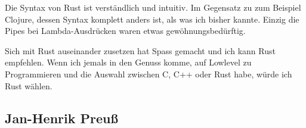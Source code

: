 \documentclass[letterpaper,12pt]{article}
\begin{document}
    Die Syntax von Rust ist verständlich und intuitiv.
    Im Gegensatz zu zum Beispiel Clojure, dessen Syntax komplett anders ist, als was ich bisher kannte.
    Einzig die Pipes bei Lambda-Ausdrücken waren etwas gewöhnungsbedürftig.

    Sich mit Rust auseinander zusetzen hat Spass gemacht und ich kann Rust empfehlen.
    Wenn ich jemals in den Genuss komme, auf Lowlevel zu Programmieren und die Auswahl zwischen C, C++ oder Rust habe,
        würde ich Rust wählen.

    \subsection{Jan-Henrik Preuß}\label{subsec:jan}


%
%
%
%
\end{document}
